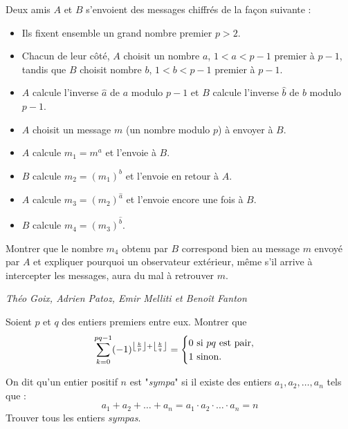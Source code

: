 \begin{exo}{}
Deux amis $A$ et $B$ s'envoient des messages chiffr\'es de la fa\c con suivante :
{\small
\begin{itemize}
\item Ils fixent ensemble un grand nombre premier $p>2$.
\item Chacun de leur c\^ot\'e, $A$ choisit un nombre $a$, $1 < a < p-1$ premier \`a $p-1$, tandis que $B$ choisit nombre $b$, $1<b<p-1$ premier \`a $p-1$.
\item $A$ calcule l'inverse $\widehat{a}$ de $a$ modulo $p-1$ et $B$ calcule l'inverse $\widehat{b}$ de $b$ modulo $p-1$.
\item $A$ choisit un message $m$ (un nombre modulo $p$) \`a envoyer \`a $B$.
\item $A$ calcule $m_1=m^{a}$ et l'envoie \`a $B$.
\item $B$ calcule $m_2=(m_1)^{b}$ et l'envoie en retour \`a $A$.
\item $A$ calcule $m_3=(m_2)^{\widehat{a}}$ et l'envoie encore une fois \`a $B$.
\item $B$ calcule $m_4=(m_3)^{\widehat{b}}$.
\end{itemize}}
Montrer que le nombre $m_4$ obtenu par $B$ correspond bien au message $m$ envoy\'e par $A$ et expliquer pourquoi un observateur ext\'erieur, m\^eme s'il arrive \`a intercepter les messages, aura du mal \`a retrouver $m$.

\medskip
\textit{Théo Goix, Adrien Patoz, Emir Melliti et Benoît Fanton }
\end{exo}


\begin{exo}{}
Soient $p$ et $q$ des entiers premiers entre eux. Montrer que
\[\displaystyle{ \sum_{k=0}^{pq-1} (-1)^{\left\lfloor \frac{k}{p}\right\rfloor + \left\lfloor \frac{k}{q}\right\rfloor} = \begin{cases} 0 \textnormal{ si } pq \textnormal{ est pair,}\\ 1 \textnormal{ sinon.}\end{cases}}\]
\end{exo}


\begin{exo}{}
On dit qu'un entier positif $n$ est "\textit{sympa}" si il existe des entiers $a_1,a_2,\dots,a_n$ tels que :
$$a_1+a_2+\dots+a_n=a_1\cdot a_2 \cdot \dots\cdot a_n=n$$
Trouver tous les entiers \textit{sympas}.

\end{exo}


